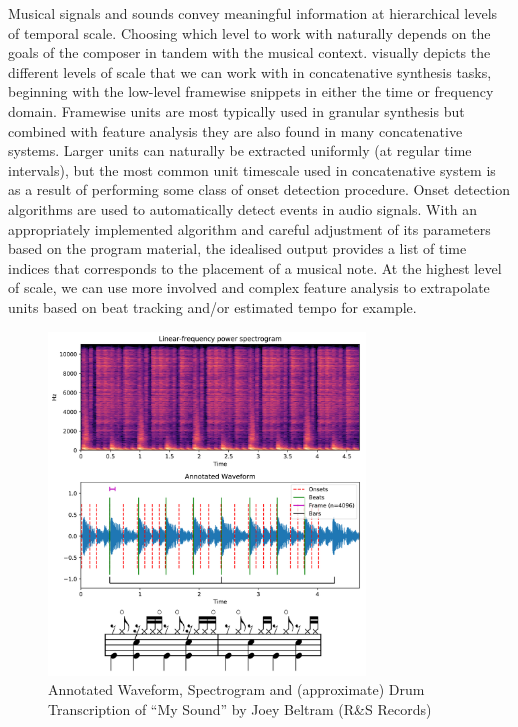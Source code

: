 Musical signals and sounds convey meaningful information at hierarchical levels of temporal scale. Choosing which level to work with naturally depends on the goals of the composer in tandem with the musical context.  visually depicts the different levels of scale that we can work with in concatenative synthesis tasks, beginning with the low-level framewise snippets in either the time or frequency domain. Framewise units are most typically used in granular synthesis but combined with feature analysis they are also found in many concatenative systems. Larger units can naturally be extracted uniformly (at regular time intervals), but the most common unit timescale used in concatenative system is as a result of performing some class of onset detection procedure. Onset detection algorithms are used to automatically detect events in audio signals. With an appropriately implemented algorithm and careful adjustment of its parameters based on the program material, the idealised output provides a list of time indices that corresponds to the placement of a musical note. At the highest level of scale, we can use more involved and complex feature analysis to extrapolate units based on beat tracking and/or estimated tempo for example.  

\begin{figure}
	\begin{center}
		\includegraphics[width=0.75\textwidth]{ch05_pyconcat/figures/unit_plot.png}
	\end{center}
	\caption[Annotated Waveform, Spectrogram and Drum Transcription of ``My Sound'' by Joey Beltram (R\&S Records)]{Annotated Waveform, Spectrogram and (approximate) Drum Transcription of ``My Sound'' by Joey Beltram (R\&S Records)}
	\label{fig:beltram}
\end{figure}

